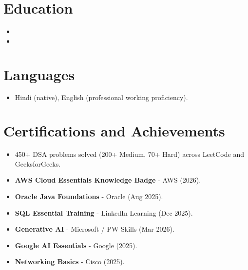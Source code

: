 \documentclass[11pt,a4paper,sans]{moderncv}
\begin{document}

\section{Education}
\vspace{1pt}
\begin{itemize}

\item{}

\vspace{3pt}

\item{}

\end{itemize}


\section{Languages}
\vspace{1pt}
\begin{itemize}
\item {Hindi (native), English (professional working proficiency).}
\end{itemize}


\section{Certifications and Achievements}
\vspace{1pt}
\begin{itemize}
\item{450+ DSA problems solved (200+ Medium, 70+ Hard) across LeetCode and GeeksforGeeks.}
\item{\textbf{AWS Cloud Essentials Knowledge Badge} - AWS (2026).}
\item{\textbf{Oracle Java Foundations} - Oracle (Aug 2025).}
\item{\textbf{SQL Essential Training} - LinkedIn Learning (Dec 2025).}
\item{\textbf{Generative AI} - Microsoft / PW Skills (Mar 2026).}
\item{\textbf{Google AI Essentials} - Google (2025).}
\item{\textbf{Networking Basics} - Cisco (2025).}
\end{itemize}
\end{document}
